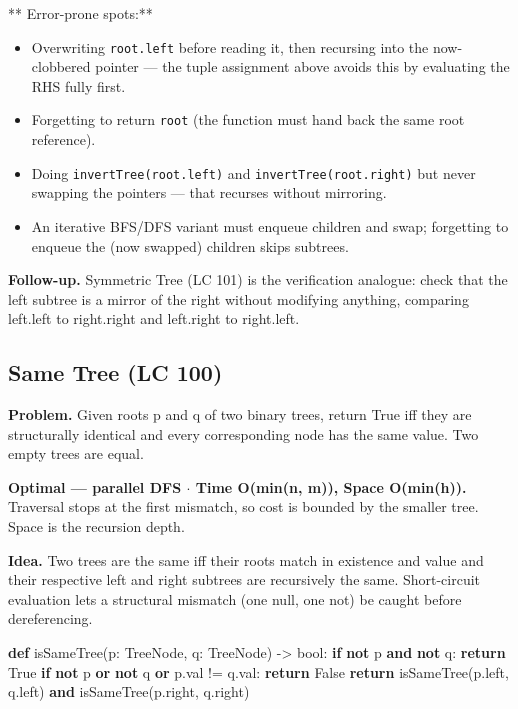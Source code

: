 \documentclass[11pt]{article}
\providecommand{\tightlist}{\setlength{\itemsep}{1pt}\setlength{\parskip}{0pt}}
\newenvironment{Shaded}{\begin{snugshade}}{\end{snugshade}}
\newcommand{\BuiltInTok}[1]{\textcolor[rgb]{0.50,0.55,0.55}{#1}}
\newcommand{\ControlFlowTok}[1]{\textcolor[rgb]{0.99,0.74,0.29}{\textbf{#1}}}
\newcommand{\KeywordTok}[1]{\textcolor[rgb]{0.81,0.81,0.76}{\textbf{#1}}}
\newcommand{\NormalTok}[1]{\textcolor[rgb]{0.81,0.81,0.76}{#1}}
\newcommand{\OperatorTok}[1]{\textcolor[rgb]{0.81,0.81,0.76}{#1}}
\newcommand{\VariableTok}[1]{\textcolor[rgb]{0.15,0.68,0.68}{#1}}
\begin{document}
** Error-prone spots:**

\begin{itemize}
\tightlist
\item
  Overwriting \texttt{root.left} before reading it, then recursing into the now-clobbered pointer --- the tuple assignment above avoids this by evaluating the RHS fully first.
\item
  Forgetting to return \texttt{root} (the function must hand back the same root reference).
\item
  Doing \texttt{invertTree(root.left)} and \texttt{invertTree(root.right)} but never swapping the pointers --- that recurses without mirroring.
\item
  An iterative BFS/DFS variant must enqueue children and swap; forgetting to enqueue the (now swapped) children skips subtrees.
\end{itemize}

\textbf{Follow-up.} Symmetric Tree (LC 101) is the verification analogue: check that the left subtree is a mirror of the right without modifying anything, comparing left.left to right.right and left.right to right.left.

\subsection{Same Tree (LC 100)}\label{same-tree-lc-100}

\textbf{Problem.} Given roots p and q of two binary trees, return True iff they are structurally identical and every corresponding node has the same value. Two empty trees are equal.

\textbf{Optimal --- parallel DFS \(\cdot\) Time O(min(n, m)), Space O(min(h)).} Traversal stops at the first mismatch, so cost is bounded by the smaller tree. Space is the recursion depth.

\textbf{Idea.} Two trees are the same iff their roots match in existence and value and their respective left and right subtrees are recursively the same. Short-circuit evaluation lets a structural mismatch (one null, one not) be caught before dereferencing.


\begin{Shaded}
\begin{Highlighting}[]
\KeywordTok{def}\NormalTok{ isSameTree(p: TreeNode, q: TreeNode) }\OperatorTok{{-}\textgreater{}} \BuiltInTok{bool}\NormalTok{:}
    \ControlFlowTok{if} \KeywordTok{not}\NormalTok{ p }\KeywordTok{and} \KeywordTok{not}\NormalTok{ q:}
        \ControlFlowTok{return} \VariableTok{True}
    \ControlFlowTok{if} \KeywordTok{not}\NormalTok{ p }\KeywordTok{or} \KeywordTok{not}\NormalTok{ q }\KeywordTok{or}\NormalTok{ p.val }\OperatorTok{!=}\NormalTok{ q.val:}
        \ControlFlowTok{return} \VariableTok{False}
    \ControlFlowTok{return}\NormalTok{ isSameTree(p.left, q.left) }\KeywordTok{and}\NormalTok{ isSameTree(p.right, q.right)}
\end{Highlighting}
\end{Shaded}
\end{document}
